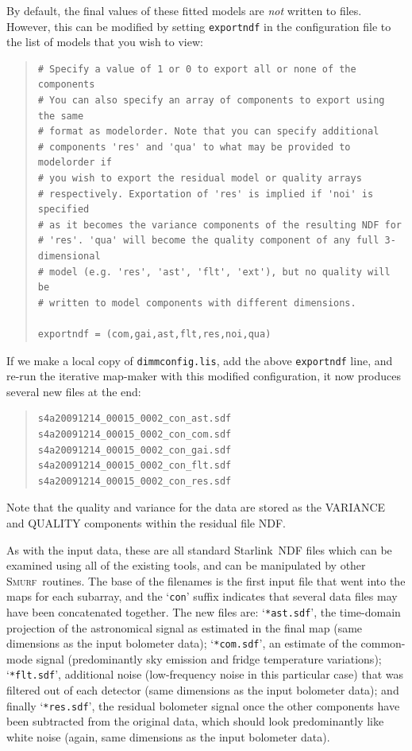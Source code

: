 \documentclass[twoside,11pt]{article}
\newcommand{\htmladdnormallink}[2]{#1}
\newcommand{\xref}[3]{#1}
\renewcommand{\_}{\texttt{\symbol{95}}}
\newenvironment{myquote}{\begin{quote}\begin{small}}{\end{small}\end{quote}}
\newcommand{\starlink}{\htmladdnormallink{Starlink}{http://starlink.jach.hawaii.edu}}
\newcommand{\smurf}{\xref{\textsc{Smurf}}{sun258}{}}
\begin{document}
By default, the final values of these fitted models are {\em not}
written to files. However, this can be modified by setting
\texttt{exportndf} in the configuration file to the list of models
that you wish to view:

\begin{myquote}
\begin{verbatim}
# Specify a value of 1 or 0 to export all or none of the components
# You can also specify an array of components to export using the same
# format as modelorder. Note that you can specify additional
# components 'res' and 'qua' to what may be provided to modelorder if
# you wish to export the residual model or quality arrays
# respectively. Exportation of 'res' is implied if 'noi' is specified
# as it becomes the variance components of the resulting NDF for
# 'res'. 'qua' will become the quality component of any full 3-dimensional
# model (e.g. 'res', 'ast', 'flt', 'ext'), but no quality will be
# written to model components with different dimensions.

exportndf = (com,gai,ast,flt,res,noi,qua)
\end{verbatim}
\end{myquote}

If we make a local copy of \texttt{dimmconfig.lis}, add the above
\texttt{exportndf} line, and re-run the iterative map-maker with this
modified configuration, it now produces several new files at the end:

\begin{myquote}
\begin{verbatim}
s4a20091214_00015_0002_con_ast.sdf
s4a20091214_00015_0002_con_com.sdf
s4a20091214_00015_0002_con_gai.sdf
s4a20091214_00015_0002_con_flt.sdf
s4a20091214_00015_0002_con_res.sdf
\end{verbatim}
\end{myquote}

Note that the quality and variance for the data are stored as the
VARIANCE and QUALITY components within the residual file NDF.

As with the input data, these are all standard \starlink\ NDF files
which can be examined using all of the existing tools, and can be
manipulated by other \smurf\ routines. The base of the filenames is
the first input file that went into the maps for each subarray, and
the `\texttt{con}' suffix indicates that several data files may have
been concatenated together. The new files are: `\texttt{*ast.sdf}',
the time-domain projection of the astronomical signal as estimated in
the final map (same dimensions as the input bolometer data);
`\texttt{*com.sdf}', an estimate of the common-mode signal
(predominantly sky emission and fridge temperature variations);
`\texttt{*flt.sdf}', additional noise (low-frequency noise in this
particular case) that was filtered out of each detector (same
dimensions as the input bolometer data); and finally
`\texttt{*res.sdf}', the residual bolometer signal once the other
components have been subtracted from the original data, which should
look predominantly like white noise (again, same dimensions as the
input bolometer data).
\end{document}
